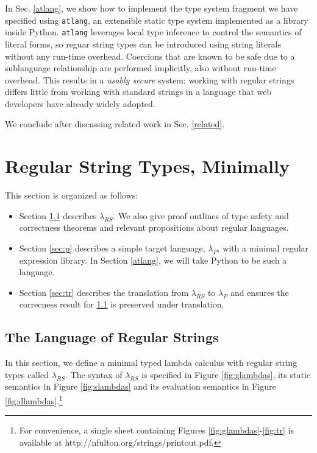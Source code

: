 \documentclass[9pt]{sig-alternate}
\theoremstyle{definition}
\newcommand{\lambdas}{\lambda_{RS}}
\newcommand{\lambdap}{\lambda_P}
\begin{document}
In Sec. \ref{atlang}, we show how to implement the type system fragment we have specified  using \texttt{atlang}, an extensible static type system implemented as a library inside Python. \texttt{atlang} leverages local type inference to control the semantics of literal forms, so reguar string types can be introduced using string literals without any run-time overhead. Coercions that are known to be  safe due to a sublanguage relationship are performed implicitly, also without run-time overhead. This results in a \emph{usably secure} system: working with regular strings differs little from working with standard strings in a language that web developers have already widely adopted.

We conclude after discussing related work in Sec. \ref{related}.

\section{Regular String Types, Minimally}\label{calculus}
\noindent
This section is organized as follows:
\begin{itemize}
\item Section \ref{sec:rs} describes $\lambda_{RS}$. We also give proof outlines of  type safety and correctness theorems and relevant propositions about regular languages.
\item Section \ref{sec:p} describes a simple target language, $\lambdap$, with a minimal regular expression library. In Section \ref{atlang}, we will take Python to be such a language.
\item Section \ref{sec:tr} describes the translation from $\lambdas$ to $\lambdap$ and ensures the correcness result for \ref{sec:rs} is preserved under translation. 
\end{itemize}

\subsection{The Language of Regular Strings}\label{sec:rs}
In this section, we define a minimal typed lambda calculus with regular string types called $\lambda_{RS}$. The syntax of $\lambda_{RS}$ is specified in Figure \ref{fig:glambdas}, its static semantics in Figure \ref{fig:slambdas} and its evaluation semantics in Figure \ref{fig:dlambdas}.\footnote{For convenience, a single sheet containing Figures \ref{fig:glambdas}-\ref{fig:tr} is available at http://nfulton.org/strings/printout.pdf.}
\end{document}
